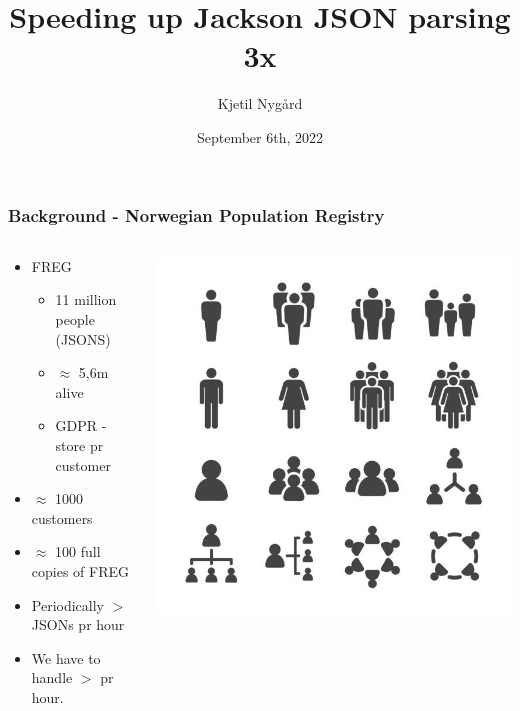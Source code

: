 \documentclass{beamer}
\title{Speeding up Jackson JSON parsing 3x}
\author{Kjetil Nygård}
\institute{TietoEvry}
\date{September 6th, 2022}
\begin{document}
    \frame{\titlepage}

    \begin{frame}
        \frametitle{Background - Norwegian Population Registry}
        \begin{columns}[c]
            \begin{column}{.68\textwidth}
                \begin{center}
                    \begin{itemize}
                        \item FREG
                        \begin{itemize}
                            \item 11 million people (JSONS)
                            \item $\approx$ 5,6m alive
                            \item GDPR - store pr customer
                        \end{itemize}
                        \item $\approx$ 1000 customers
                        \item $\approx$ 100 full copies of FREG
                        \item Periodically $>$  JSONs pr hour
                        \item We have to handle $>$  pr hour.
                    \end{itemize}
                \end{center}
            \end{column}
            \begin{column}{.32\textwidth}
                \begin{center}
                    \includegraphics[width=\textwidth]{images/freg-bilde.jpg}

\end{center}
\end{column}
\end{columns}
\end{frame}
\end{document}
